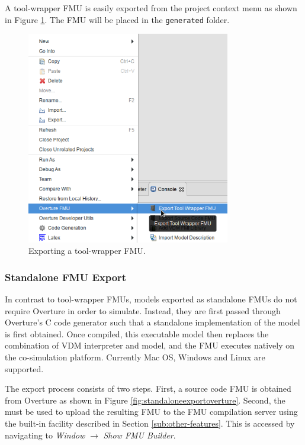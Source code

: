 A tool-wrapper FMU is easily exported from the project context menu as shown in Figure \ref{fig:toolwrapperexportoverture}.
%
The FMU will be placed in the \texttt{generated} folder.
%
%
%
\begin{figure}[ht]
\centering
\includegraphics[width=3.5in]{figures/toolWrapperExportOverture.png}
\caption{Exporting a tool-wrapper FMU.}
\label{fig:toolwrapperexportoverture}
\end{figure}
\clearpage
%
%
%
\subsubsection{Standalone FMU Export}
In contrast to tool-wrapper FMUs, models exported as standalone FMUs do not require Overture in order to simulate.
%
Instead, they are first passed through Overture's C code generator such that a standalone implementation of the model is first obtained.
%
Once compiled, this executable model then replaces the combination of VDM interpreter and model, and the FMU executes natively on the co-simulation platform.
%
Currently Mac OS, Windows and Linux are supported.

The export process consists of two steps.
%
First, a source code FMU is obtained from Overture as shown in Figure \ref{fig:standaloneexportoverture}.
%
Second, the \intoapp{} must be used to upload the resulting FMU to the FMU compilation server using the built-in facility described in Section \ref{sub:other-features}.
%
This is accessed by navigating to \emph{Window} $\rightarrow$ \emph{Show FMU Builder}.

